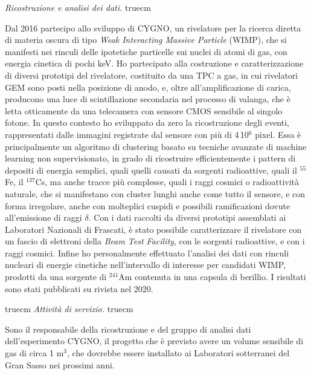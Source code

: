 \documentclass[11pt,twoside,a4paper]{article}
\begin{document}
\textit{Ricostruzione e analisi dei dati.}
 truecm

Dal 2016 partecipo allo sviluppo di CYGNO, un rivelatore per la
ricerca diretta di materia oscura di tipo \textit{Weak Interacting
  Massive Particle} (WIMP), che si manifesti nei rinculi delle
ipotetiche particelle sui nuclei di atomi di gas, con energia cinetica
di pochi keV. Ho partecipato alla costruzione e caratterizzazione di
diversi prototipi del rivelatore, costituito da una TPC a gas, in cui
rivelatori GEM sono posti nella posizione di anodo, e, oltre
all'amplificazione di carica, producono una luce di scintillazione
secondaria nel processo di valanga, che \`e letta otticamente da una
telecamera con sensore CMOS sensibile al singolo fotone.  In questo
contesto ho sviluppato da zero la ricostruzione degli eventi,
rappresentati dalle immagini registrate dal sensore con pi\`u di
4\,10$^6$ pixel.  Essa \`e principalmente un algoritmo di clustering
basato su tecniche avanzate di machine learning non supervisionato, in
grado di ricostruire efficientemente i pattern di depositi di energia
semplici, quali quelli causati da sorgenti radioattive, quali il
$^{55}$Fe, il $^{137}$Cs, ma anche tracce pi\`u complesse, quali i
raggi cosmici o radioattivit\`a naturale, che si manifestano con
cluster lunghi anche come tutto il sensore, e con forma irregolare,
anche con molteplici cuspidi e possibili ramificazioni dovute
all'emissione di raggi $\delta$.  Con i dati raccolti da diversi
prototipi assemblati ai Laboratori Nazionali di Frascati, \`e stato
possibile caratterizzare il rivelatore con un fascio di elettroni
della \textit{Beam Test Facility}, con le sorgenti radioattive, e con
i raggi cosmici. Infine ho personalmente effettuato l'analisi dei dati
con rinculi nucleari di energie cinetiche nell'intervallo di interesse
per candidati WIMP, prodotti da una sorgente di $^{241}$Am contenuta
in una capsula di berillio. I risultati sono stati pubblicati su
rivista nel 2020.

 truecm
\textit{Attivit\`a di servizio.}
 truecm

Sono il responsabile della ricostruzione e del gruppo di analisi dati
dell'esperimento CYGNO, il progetto che \`e previsto avere un volume
sensibile di gas di circa 1 m$^3$, che dovrebbe essere installato ai
Laboratori sotterranei del Gran Sasso nei prossimi anni.



\end{document}
